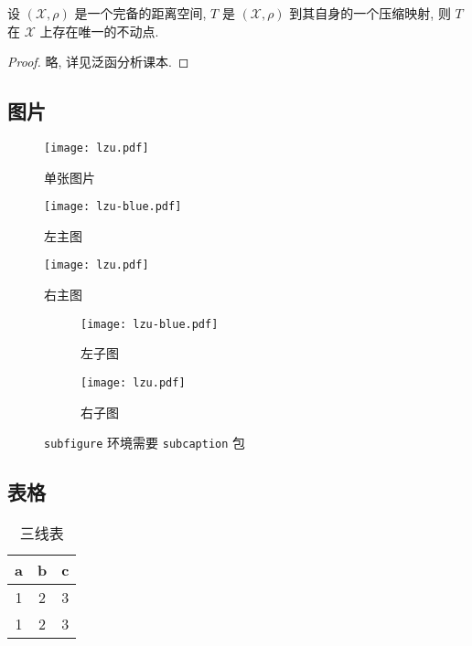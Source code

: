 \documentclass{lzuthesis}
\begin{document}
\begin{theorem}
	\label{thm1}
	设 $(\mathscr{X}, \rho)$ 是一个完备的距离空间, $T$ 是 $(\mathscr{X},
	\rho)$ 到其自身的一个压缩映射, 则 $T$ 在 $\mathscr{X}$
	上存在唯一的不动点.
\end{theorem}

\begin{proof}
	略, 详见泛函分析课本. 
\end{proof}

\subsection{图片}

\begin{figure}[!h]
	\centering
	\texttt{[image: lzu.pdf]}
	\caption{单张图片}
	\label{p1}
\end{figure}

\begin{figure}[!h]
	\centering
	\begin{minipage}[t]{0.25\linewidth}
		\centering
		\texttt{[image: lzu-blue.pdf]}
		\caption{左主图}
	\end{minipage}
	\quad
	\begin{minipage}[t]{0.25\linewidth} 
		\centering 
		\texttt{[image: lzu.pdf]} 
		\caption{右主图} 
	\end{minipage}
\end{figure}

\begin{figure}[!h]
	\centering
	\begin{subfigure}[b]{0.25\linewidth}
		\texttt{[image: lzu-blue.pdf]}
		\caption{左子图}
	\end{subfigure}
	\quad
	\begin{subfigure}[b]{0.25\linewidth}
		\texttt{[image: lzu.pdf]}
		\caption{右子图}
	\end{subfigure}
	\caption{\texttt{subfigure} 环境需要 \texttt{subcaption} 包}
\end{figure}

\subsection{表格}

\begin{table}[!h]
	\caption{三线表}
	\centering
	\begin{tabular}{ccc}
		\hline
		a &b &c \\
		\hline
		1 &2 &3 \\
		1 &2 &3 \\
		\hline
	\end{tabular}
\end{table}
\end{document}
